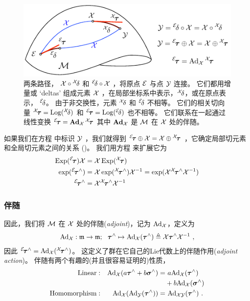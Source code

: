 \begin{figure}[tb]
\centering
\includegraphics{figures/adjoint}
\caption{两条路径， $\cX\circ{^\cX}\!\delta$ 和 ${^\cE}\!\delta\circ\cX$ ，将原点 $\cE$ 与点 $\cY$ 连接。
它们都用增量或 `deltas' 组成元素 $\cX$ ，在局部坐标系中表示，${^\cX}\!\delta$，或在原点表示， ${^\cE}\!\delta$。
由于非交换性，元素 ${^\cX}\!\delta$ 和 ${^\cE}\!\delta$ 不相等。 
它们的相关切向量 ${^\cX}\!\bftau=\Log({^\cX}\!\delta)$ 和 ${^\cE}\!\bftau=\Log({^\cE}\!\delta)$ 也不相等。
它们联系在一起通过线性变换 ${^\cE}\!\bftau=\Ad[\cM]{\cX}\,{^\cX}\!\bftau$ 其中
$\Ad{\cX}$ 是 $\cM$ 在 $\cX$ 处的伴随。 
}
\label{fig:adjoint}
\end{figure}


如果我们在方程  中标识 $\cY$ ，我们就得到 ${{^\cE\!\bftau}\op\cX} = {\cX\op{^\cX\!\bftau}}$ ，它确定局部切元素和全局切元素之间的关系 ()。
我们用方程  来扩展它为
%
\begin{align*}
\Exp({^\cE}\!\bftau)\cX 
 &= \cX\Exp({^\cX}\!\bftau) \\
\exp({^\cE}\!\bftau\hhat) 
 &= \cX \exp({^\cX}\!\bftau\hhat) \cX\inv 
  = \exp(\cX {^\cX}\!\bftau\hhat \cX\inv) \\
{^\cE}\!\bftau\hhat 
 &= \cX {^\cX}\!\bftau\hhat \cX\inv 
\end{align*}
%
\subsubsection{伴随}
因此，我们将 $\cM$ 在 $\cX$ 处的伴随(\emph{adjoint})，记为 $\Adh[\cM]{\cX}$，定义为 
%
\begin{align}
\Adh{\cX}:\frak{m}\to\frak{m};~~ \bftau\hhat\mapsto \Adh[\cM]{\cX}(\bftau\hhat) \te \cX \bftau\hhat \cX\inv \label{equ:Adjh1} 
~,
\end{align}
%
因此 ${^\cE}\!\bftau\hhat = \Adh[\cM]{\cX}({^\cX}\!\bftau\hhat)$。 
这定义了群在它自己的Lie代数上的伴随作用(\emph{adjoint action})。
伴随有两个有趣的(并且很容易证明的)性质，
%
\begin{align*}
\textrm{Linear} &:& \Adh{\cX}(a\bftau\hhat+b\bfsigma\hhat) =& ~a\Adh{\cX}(\bftau\hhat)\\
&&&+b\Adh{\cX}(\bfsigma\hhat) 
\\
\textrm{Homomorphism} &:& \Adh{\cX}(\Adh{\cY}(\bftau\hhat)) =& ~\Adh{\cX\cY}(\bftau\hhat) 
~.
\end{align*}
%
